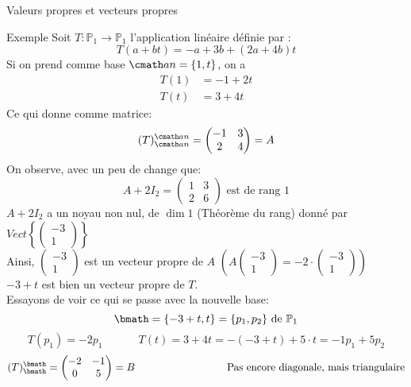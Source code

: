 \begin{parag}{Valeurs propres et vecteurs propres}
    \begin{subparag}{Exemple}
        Soit $T : \mathbb{P}_1 \to \mathbb{P}_1$ l'application linéaire définie par : 
        \[T(a + bt) = -a + 3b + (2a + 4b)t\]
        Si on prend comme base $\cmath an = \{1, t\}$, on a
        \begin{align*}
            T(1) &= -1 + 2t\\
            T(t) &= 3 + 4t
        \end{align*}
        Ce qui donne comme matrice:
        \[(T)_{\cmath an}^{\cmath an} = \begin{pmatrix}
            -1  & 3 \\ 2 &  4
        \end{pmatrix} = A\]
        On observe, avec un peu de change que:
        \[A + 2I_2 = \begin{pmatrix}
            1 & 3 \\ 2 & 6
        \end{pmatrix} \text{ est de rang }1\]
        $A + 2I_2$ a un noyau non nul, de $\dim 1$ (Théorème du rang) donné par $Vect\left\{ \begin{pmatrix}
            -3 \\ 1
        \end{pmatrix}\right\}$\\
        Ainsi, $\begin{pmatrix}
            -3 \\ 1
        \end{pmatrix}$ est un vecteur propre de $A$ $\left(A\begin{pmatrix}
            -3 \\ 1
        \end{pmatrix} = -2 \cdot\begin{pmatrix}
            -3 \\ 1
        \end{pmatrix}\right)$\\
        $-3 + t$ est bien un vecteur propre de $T$.\\
        Essayons de voir ce qui se passe avec la nouvelle base:
        \[\bmath = \{-3 + t, t\} = \{p_1, p_2\} \text{ de } \mathbb{P}_1\]
        \[T(p_1)= -2p_1 \; \; \; \hspace{1cm} T(t) = 3 + 4t = -(-3 + t) + 5\cdot t = -1 p_1 + 5p_2\]
        \[(T)_\bmath^\bmath = \begin{pmatrix}
            -2 & -1 \\ 0 & 5
        \end{pmatrix} = B \hspace{3cm} \text{ Pas encore diagonale, mais triangulaire}\]

\end{subparag}
\end{parag}
